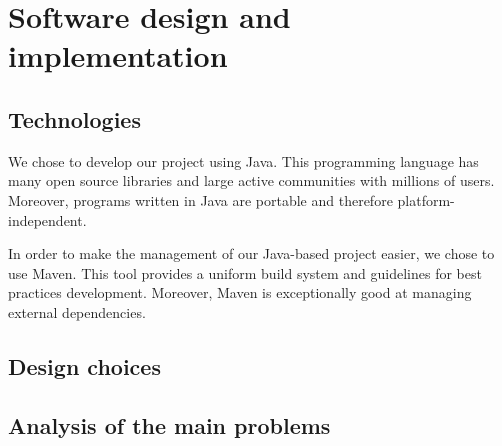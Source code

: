 \section{Software design and implementation}
    \subsection{Technologies}
        We chose to develop our project using Java. This programming language has many open source libraries and large active communities with millions of users. Moreover, programs written in Java are portable and therefore platform-independent.\par

        In order to make the management of our Java-based project easier, we chose to use Maven\footnotemark{}. This tool provides a uniform build system and guidelines for best practices development. Moreover, Maven is exceptionally good at managing external dependencies.\par

    \subsection{Design choices}
    \subsection{Analysis of the main problems}